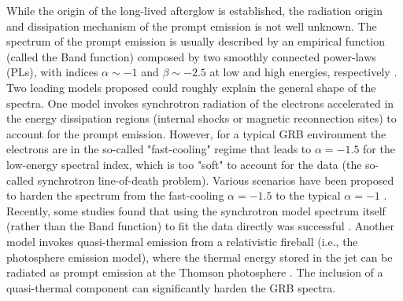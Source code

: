 \documentclass[twocolumn]{aastex631}
\begin{document}
While the origin of the long-lived afterglow is established, the radiation origin and dissipation mechanism of the prompt emission is not well unknown.
The spectrum of the prompt emission is usually  described
by an empirical function (called the Band function) composed by two smoothly connected power-laws (PLs), with indices
$\alpha\sim -1$ and $\beta\sim -2.5$ at low and high energies, respectively \citep{1993ApJ...413..281B}. Two
leading models proposed  could  roughly explain the  general shape of
the spectra. One model invokes synchrotron radiation  of the electrons accelerated
in the energy dissipation regions (internal shocks or magnetic reconnection sites) to account
for the  prompt emission. However, for a typical GRB environment the electrons are in the so-called "fast-cooling" regime that leads to $\alpha= -1.5$ for the low-energy spectral index, which is too "soft" to account for
the data (the so-called synchrotron line-of-death problem). Various scenarios have been proposed 
to harden the spectrum from the fast-cooling $\alpha= -1.5$ to the typical $\alpha= -1$ \citep[e.g.,][]{2006ApJ...653..454P,2014NatPh..10..351U,2011A&A...526A.110D}. Recently, some studies found that using the synchrotron model spectrum itself (rather than the Band function) to fit the data directly was successful \citep{2014ApJ...784...17B,2016ApJ...816...72Z,2019A&A...627A.105B}. Another model invokes quasi-thermal emission from a relativistic fireball (i.e., the photosphere emission model), where the thermal energy stored in the jet can
be radiated as prompt emission at the Thomson photosphere \citep[e.g.,][]{2000ApJ...530..292M,2010ApJ...709L.172R,2015ApJ...801..103G}.  The inclusion of a quasi-thermal component can significantly harden the GRB spectra. 
\end{document}
